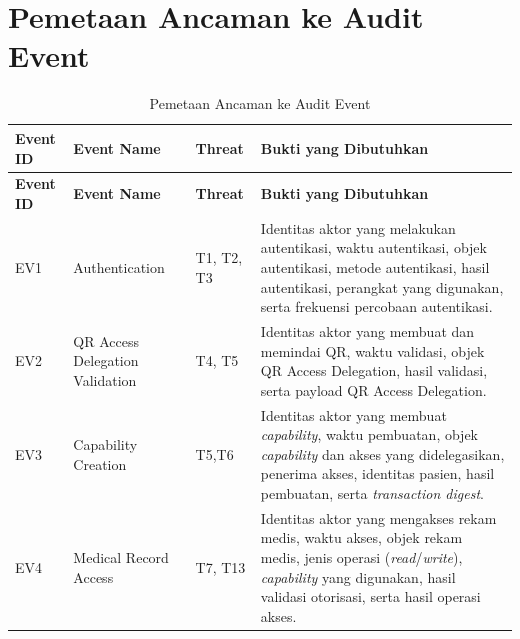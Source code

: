 \chapter{Pemetaan Ancaman ke Audit Event}


\begin{xltabular}
    {\textwidth}
    {|>{\centering\arraybackslash}p{1.2cm}
     |>{\raggedright\arraybackslash}p{3.2cm}
     |>{\centering\arraybackslash}p{1.8cm}
     |X|}

\caption{Pemetaan Ancaman ke Audit Event}
\label{tab:threat-event-mapping}\\

\hline

\textbf{Event ID} &
\textbf{Event Name} &
\textbf{Threat} &
\textbf{Bukti yang Dibutuhkan} \\

\hline
\endfirsthead

\hline

\textbf{Event ID} &
\textbf{Event Name} &
\textbf{Threat} &
\textbf{Bukti yang Dibutuhkan} \\

\hline
\endhead

\hline
\endfoot

\hline
\endlastfoot

EV1 &
Authentication &
T1, T2, T3 &
Identitas aktor yang melakukan autentikasi, waktu autentikasi, objek autentikasi, metode autentikasi, hasil autentikasi, perangkat yang digunakan, serta frekuensi percobaan autentikasi. \\

\hline

EV2 &
QR Access Delegation Validation &
T4, T5 &
Identitas aktor yang membuat dan memindai QR, waktu validasi, objek QR Access Delegation, hasil validasi, serta payload QR Access Delegation. \\

\hline

EV3 &
Capability Creation &
T5,T6 &
Identitas aktor yang membuat \textit{capability}, waktu pembuatan, objek \textit{capability} dan akses yang didelegasikan, penerima akses, identitas pasien, hasil pembuatan, serta \textit{transaction digest}. \\

\hline

EV4 &
Medical Record Access &
T7, T13 &
Identitas aktor yang mengakses rekam medis, waktu akses, objek rekam medis, jenis operasi (\textit{read}/\textit{write}), \textit{capability} yang digunakan, hasil validasi otorisasi, serta hasil operasi akses. \\


\end{xltabular}
